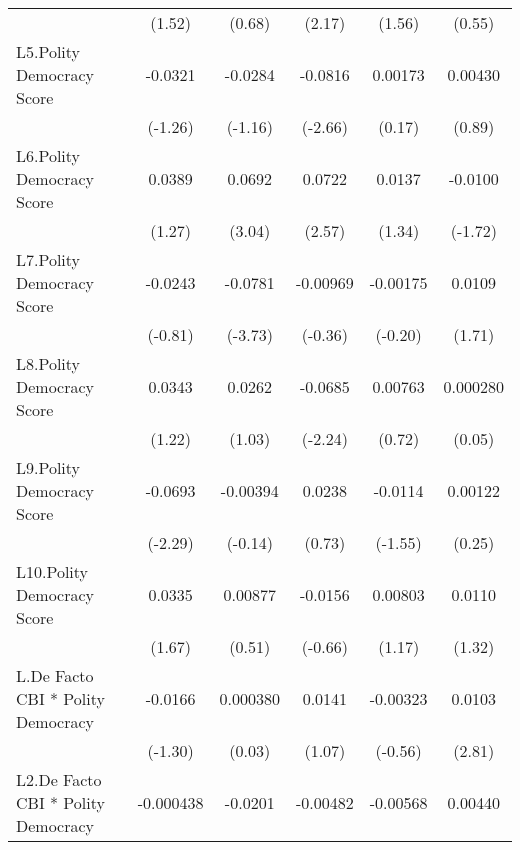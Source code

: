 {\begin{longtable}{l*{5}{c}}
                &   (1.52)         &   (0.68)         &   (2.17)         &   (1.56)         &   (0.55)         \\
[1em]
L5.Polity Democracy Score&  -0.0321         &  -0.0284         &  -0.0816\sym{**} &  0.00173         &  0.00430         \\
                &  (-1.26)         &  (-1.16)         &  (-2.66)         &   (0.17)         &   (0.89)         \\
[1em]
L6.Polity Democracy Score&   0.0389         &   0.0692\sym{**} &   0.0722\sym{*}  &   0.0137         &  -0.0100         \\
                &   (1.27)         &   (3.04)         &   (2.57)         &   (1.34)         &  (-1.72)         \\
[1em]
L7.Polity Democracy Score&  -0.0243         &  -0.0781\sym{***}& -0.00969         & -0.00175         &   0.0109         \\
                &  (-0.81)         &  (-3.73)         &  (-0.36)         &  (-0.20)         &   (1.71)         \\
[1em]
L8.Polity Democracy Score&   0.0343         &   0.0262         &  -0.0685\sym{*}  &  0.00763         & 0.000280         \\
                &   (1.22)         &   (1.03)         &  (-2.24)         &   (0.72)         &   (0.05)         \\
[1em]
L9.Polity Democracy Score&  -0.0693\sym{*}  & -0.00394         &   0.0238         &  -0.0114         &  0.00122         \\
                &  (-2.29)         &  (-0.14)         &   (0.73)         &  (-1.55)         &   (0.25)         \\
[1em]
L10.Polity Democracy Score&   0.0335         &  0.00877         &  -0.0156         &  0.00803         &   0.0110         \\
                &   (1.67)         &   (0.51)         &  (-0.66)         &   (1.17)         &   (1.32)         \\
[1em]
L.De Facto CBI * Polity Democracy&  -0.0166         & 0.000380         &   0.0141         & -0.00323         &   0.0103\sym{**} \\
                &  (-1.30)         &   (0.03)         &   (1.07)         &  (-0.56)         &   (2.81)         \\
[1em]
L2.De Facto CBI * Polity Democracy&-0.000438         &  -0.0201\sym{*}  & -0.00482         & -0.00568         &  0.00440         \\

\end{longtable}}
